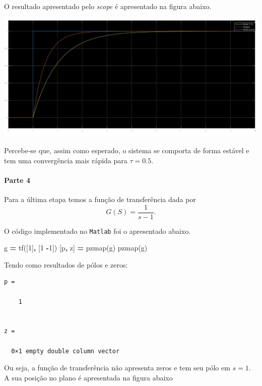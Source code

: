 \documentclass[
]{book}
\newenvironment{Shaded}{\begin{snugshade}}{\end{snugshade}}
\newcommand{\FloatTok}[1]{\textcolor[rgb]{0.00,0.00,0.81}{#1}}
\newcommand{\NormalTok}[1]{#1}
\newcommand{\OperatorTok}[1]{\textcolor[rgb]{0.81,0.36,0.00}{\textbf{#1}}}
\newcommand{\VariableTok}[1]{\textcolor[rgb]{0.00,0.00,0.00}{#1}}
\begin{document}
O resultado apresentado pelo \emph{scope} é apresentado na figura abaixo.

\includegraphics{Imagens/Lab2/resultSim1.jpg}

Percebe-se que, assim como esperado, o sistema se comporta de forma estável e tem uma convergência mais rápida para \(\tau = 0.5\).

\hypertarget{parte-4}{%
\paragraph*{Parte 4}\label{parte-4}}

Para a última etapa temos a função de transferência dada por
\[
G(S)= \frac {1}{s-1}.
\]

O código implementado no \texttt{Matlab} foi o apresentado abaixo.

\begin{Shaded}
\begin{Highlighting}[]
\VariableTok{g} \OperatorTok{=} \VariableTok{tf}\NormalTok{([}\FloatTok{1}\NormalTok{]}\OperatorTok{,}\NormalTok{ [}\FloatTok{1} \OperatorTok{{-}}\FloatTok{1}\NormalTok{])}
\NormalTok{[}\VariableTok{p}\OperatorTok{,} \VariableTok{z}\NormalTok{] }\OperatorTok{=} \VariableTok{pzmap}\NormalTok{(}\VariableTok{g}\NormalTok{)}
\VariableTok{pzmap}\NormalTok{(}\VariableTok{g}\NormalTok{)}
\end{Highlighting}
\end{Shaded}

Tendo como resultados de pólos e zeros:

\begin{verbatim}
p =

    1


z =

  0×1 empty double column vector
\end{verbatim}

Ou seja, a função de transferência não apresenta zeros e tem seu pólo em \(s = 1\). A sua posição no plano é apresentada na figura abaixo
\end{document}
